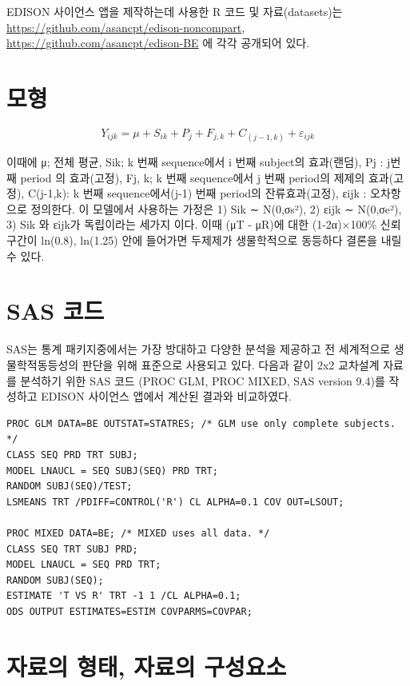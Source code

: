 \documentclass[12pt,]{krantz}
\begin{document}
EDISON 사이언스 앱을 제작하는데 사용한 R 코드 및 자료(datasets)는 \url{https://github.com/asancpt/edison-noncompart}, \url{https://github.com/asancpt/edison-BE} 에 각각 공개되어 있다.

\hypertarget{section-1}{%
\section{모형}\label{section-1}}

\[
Y_{ijk} = \mu + S_{ik} + P_{j} + F_{j,k} + C_{(j-1,k)} + \varepsilon_{ijk}
\]

이때에 μ; 전체 평균, Sik; k 번째 sequence에서 i 번째 subject의 효과(랜덤), Pj : j번째 period 의 효과(고정), Fj, k; k 번째 sequence에서 j 번째 period의 제제의 효과(고정), C(j-1,k): k 번째 sequence에서(j-1) 번째 period의 잔류효과(고정), εijk : 오차항으로 정의한다. 이 모델에서 사용하는 가정은 1) Sik ∼ N(0,σs²), 2) εijk ∼ N(0,σe²), 3) Sik 와 εijk가 독립이라는 세가지 이다. 이때 (μT - μR)에 대한 (1-2α)×100\% 신뢰구간이 ln(0.8), ln(1.25) 안에 들어가면 두제제가 생물학적으로 동등하다 결론을 내릴 수 있다.

\hypertarget{sas-}{%
\section{SAS 코드}\label{sas-}}

SAS는 통계 패키지중에서는 가장 방대하고 다양한 분석을 제공하고 전 세계적으로 생물학적동등성의 판단을 위해 표준으로 사용되고 있다. 다음과 같이 2x2 교차설계 자료를 분석하기 위한 SAS 코드 (PROC GLM, PROC MIXED, SAS version 9.4)를 작성하고 EDISON 사이언스 앱에서 계산된 결과와 비교하였다.

\begin{verbatim}
PROC GLM DATA=BE OUTSTAT=STATRES; /* GLM use only complete subjects. */
CLASS SEQ PRD TRT SUBJ;
MODEL LNAUCL = SEQ SUBJ(SEQ) PRD TRT;
RANDOM SUBJ(SEQ)/TEST;
LSMEANS TRT /PDIFF=CONTROL('R') CL ALPHA=0.1 COV OUT=LSOUT;

PROC MIXED DATA=BE; /* MIXED uses all data. */
CLASS SEQ TRT SUBJ PRD;
MODEL LNAUCL = SEQ PRD TRT;
RANDOM SUBJ(SEQ);
ESTIMATE 'T VS R' TRT -1 1 /CL ALPHA=0.1;
ODS OUTPUT ESTIMATES=ESTIM COVPARMS=COVPAR;
\end{verbatim}

\hypertarget{section-2}{%
\section{자료의 형태, 자료의 구성요소}\label{section-2}}
\end{document}
